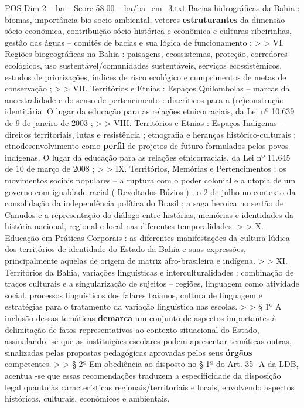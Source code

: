 \begin{textsample}{POS Dim 2 – ba – Score 58.00 – ba/ba\_em\_3.txt}
Bacias hidrográficas da Bahia : biomas, importância bio-socio-ambiental, vetores \textbf{estruturantes} da dimensão sócio-econômica, contribuição sócio-histórica e econômica e culturas ribeirinhas, gestão das águas – comitês de bacias e sua lógica de funcionamento ; > > VI.
Regiões biogeográficas na Bahia : paisagens, ecossistemas, proteção, corredores ecológicos, uso sustentável/comunidades sustentáveis, serviços ecossistêmicos, estudos de priorizações, índices de risco ecológico e cumprimentos de metas de conservação ; > > VII.
Territórios e Etnias : Espaços Quilombolas – marcas da ancestralidade e do senso de pertencimento : diacríticos para a (re)construção identitária.
O lugar da educação para as relações etnicorraciais, da Lei nº 10.639 de 9 de janeiro de 2003 ; > > VIII.
Territórios e Etnias : Espaços Indígenas – direitos territoriais, lutas e resistência ; etnografia e heranças histórico-culturais ; etnodesenvolvimento como \textbf{perfil} de projetos de futuro formulados pelos povos indígenas.
O lugar da educação para as relações etnicorraciais, da Lei nº 11.645 de 10 de março de 2008 ; > > IX.
Territórios, Memórias e Pertencimentos : os movimentos sociais populares – a ruptura com o poder colonial e a utopia de um governo com igualdade racial ( Revoltados Búzios ) ; o 2 de julho no contexto da consolidação da independência política do Brasil ; a saga heroica no sertão de Canudos e a representação do diálogo entre histórias, memórias e identidades da história nacional, regional e local nas diferentes temporalidades. > > X.
Educação em Práticas Corporais : as diferentes manifestações da cultura lúdica dos territórios de identidade do Estado da Bahia e suas expressões, principalmente aquelas de origem de matriz afro-brasileira e indígena. > > XI.
Territórios da Bahia, variações linguísticas e interculturalidades : combinação de traços culturais e a singularização de sujeitos – regiões, linguagem como atividade social, processos linguísticos dos falares baianos, cultura de linguagem e estratégias para o tratamento da variação linguística nas escolas. > > § 1º A inclusão dessas temáticas \textbf{demarca} um conjunto de aspectos importantes à delimitação de fatos representativos ao contexto situacional do Estado, assinalando -se que as instituições escolares podem apresentar temáticas outras, sinalizadas pelas propostas pedagógicas aprovadas pelos seus \textbf{órgãos} competentes. > > § 2º Em obediência ao disposto no § 1º do Art. 35 -A da LDB, acentua -se que essas recomendações traduzem a especificidade da disposição legal quanto às características regionais/territoriais e locais, envolvendo aspectos históricos, culturais, econômicos e ambientais.

\end{textsample}
